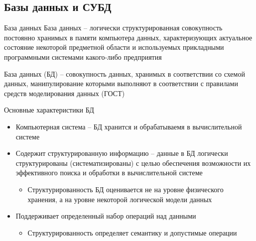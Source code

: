 \documentclass[12pt]{article}
\begin{document}
\newpage

\subsection{Базы данных и СУБД}

\begin{defin}{База данных}
    База данных -- логически структурированная совокупность постоянно хранимых в памяти компьютера данных, характеризующих актуальное состояние некоторой предметной области и используемых прикладными программными системами какого-либо предприятия

    База данных (БД) -- совокупность данных, хранимых в соответствии со схемой данных, манипулирование которыми выполняют в соответствии с правилами средств моделирования данных (ГОСТ)
\end{defin}

\begin{nota}{Основные характеристики БД}
    \begin{itemize}
        \item Компьютерная система -- БД хранится и обрабатываемя в вычислительной системе
        \item Содержит структурированную информацию -- данные в БД логически структурированы (систематизированы) с целью обеспечения возможности их эффективного поиска и обработки в вычислительной системе 
        \begin{itemize}
            \item Структурированность БД оценивается не на уровне физического хранения, а на уровне некоторой логической модели данных
        \end{itemize}
        \item Поддерживает определенный набор операций над данными 
        \begin{itemize}
            \item Структурированность определяет семантику и допустимые операции
        \end{itemize}
    \end{itemize}
\end{nota}
\end{document}
